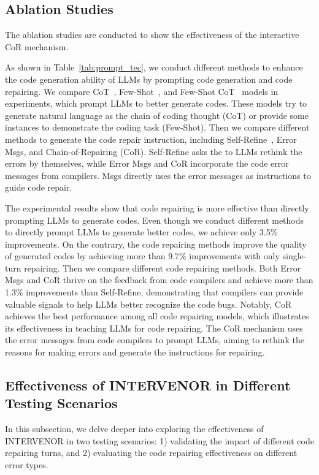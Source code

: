\documentclass[11pt]{article}
\begin{document}
%
 \subsection{Ablation Studies}
The ablation studies are conducted to show the effectiveness of the interactive CoR mechanism.

As shown in Table~\ref{tab:prompt_tec}, we conduct different methods to enhance the code generation ability of LLMs by prompting code generation and code repairing. We compare CoT~\cite{kojima2023large}, Few-Shot~\cite{chen2021evaluating}, and Few-Shot CoT~\cite{wei2023chainofthought} models in experiments, which prompt LLMs to better generate codes. These models try to generate natural language as the chain of coding thought (CoT) or provide some instances to demonstrate the coding task (Few-Shot). Then we compare different methods to generate the code repair instruction, including Self-Refine~\cite{madaan2023selfrefine}, Error Msgs, and Chain-of-Repairing (CoR). Self-Refine asks the to LLMs rethink the errors by themselves, while Error Msgs and CoR incorporate the code error messages from compilers. Msgs directly uses the error messages as instructions to guide code repair.


The experimental results show that code repairing is more effective than directly prompting LLMs to generate codes. Even though we conduct different methods to directly prompt LLMs to generate better codes, we achieve only 3.5\% improvements. On the contrary, the code repairing methods improve the quality of generated codes by achieving more than 9.7\% improvements with only single-turn repairing. Then we compare different code repairing methods. Both Error Msgs and CoR thrive on the feedback from code compilers and achieve more than 1.3\% improvements than Self-Refine, demonstrating that compilers can provide valuable signals to help LLMs better recognize the code bugs. Notably, CoR achieves the best performance among all code repairing models, which illustrates its effectiveness in teaching LLMs for code repairing. The CoR mechanism uses the error messages from code compilers to prompt LLMs, aiming to rethink the reasons for making errors and generate the instructions for repairing.



\subsection{Effectiveness of INTERVENOR in Different Testing Scenarios}
In this subsection, we delve deeper into exploring the effectiveness of INTERVENOR in two testing scenarios: 1) validating the impact of different code repairing turns, and 2) evaluating the code repairing effectiveness on different error types.
\end{document}
